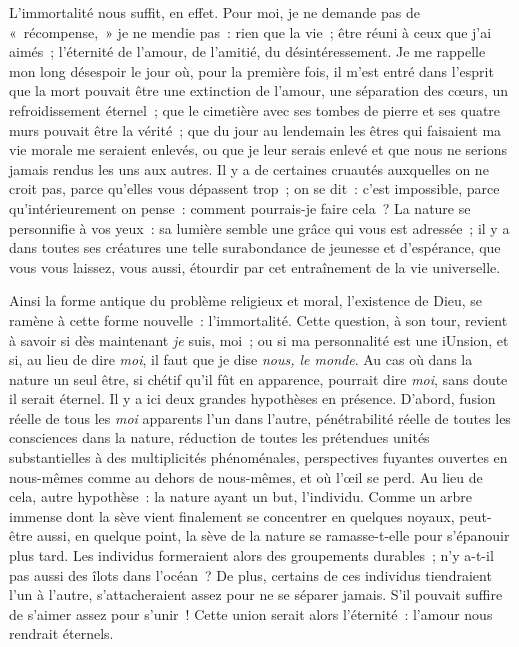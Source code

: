 \documentclass[french,twoside]{book} %
\begin{document}
L’immortalité nous suffit, en effet. Pour moi, je ne demande pas de « récompense, » je ne mendie pas : rien que la vie ; être réuni à ceux que j’ai aimés ; l’éternité de l’amour, de l’amitié, du désintéressement. Je me rappelle mon long désespoir le jour où, pour la première fois, il m’est entré dans l’esprit que la mort pouvait être une extinction de l’amour, une séparation des cœurs, un refroidissement éternel ; que le cimetière avec ses tombes de pierre et ses quatre murs pouvait être la vérité ; que du jour au lendemain les êtres qui faisaient ma vie morale me seraient enlevés, ou que je leur serais enlevé et que nous ne serions jamais rendus les uns aux autres. Il y a de certaines cruautés auxquelles on ne croit pas, parce qu’elles vous dépassent trop ; on se dit : c’est impossible, parce qu’intérieurement on pense : comment pourrais-je faire cela ? La nature se personnifie à vos yeux : sa lumière semble une grâce qui vous est adressée ; il y a dans toutes ses créatures une telle surabondance de jeunesse et d’espérance, que vous vous laissez, vous aussi, étourdir par cet entraînement de la vie universelle.\par
Ainsi la forme antique du problème religieux et moral, l’existence de Dieu, se ramène à cette forme nouvelle : l’immortalité. Cette question, à son tour, revient à savoir si dès maintenant \emph{je} suis, moi ; ou si ma personnalité est une iUnsion, et si, au lieu de dire \emph{moi}, il faut que je dise \emph{nous, le monde}. Au cas où dans la nature un seul être, si chétif qu’il fût en apparence, pourrait dire \emph{moi}, sans doute il serait éternel. Il y a ici deux grandes hypothèses en présence. D’abord, fusion réelle de tous les \emph{moi} apparents l’un dans l’autre, pénétrabilité réelle de toutes les consciences dans la nature, réduction de toutes les prétendues unités substantielles à des multiplicités phénoménales, perspectives fuyantes ouvertes en nous-mêmes comme au dehors de nous-mêmes, et où l’œil se perd. Au lieu de cela, autre hypothèse : la nature ayant un but, l’individu. Comme un arbre immense dont la sève vient finalement se concentrer en quelques noyaux, peut-être aussi, en quelque point, la sève de la nature se ramasse-t-elle pour s’épanouir plus tard. Les individus formeraient alors des groupements durables ; n’y a-t-il pas aussi des îlots dans l’océan ? De plus, certains de ces individus tiendraient l’un à l’autre, s’attacheraient assez pour ne se séparer jamais. S’il pouvait suffire de s’aimer assez pour s’unir ! Cette union serait alors l’éternité : l’amour nous rendrait éternels.\par
\end{document}
